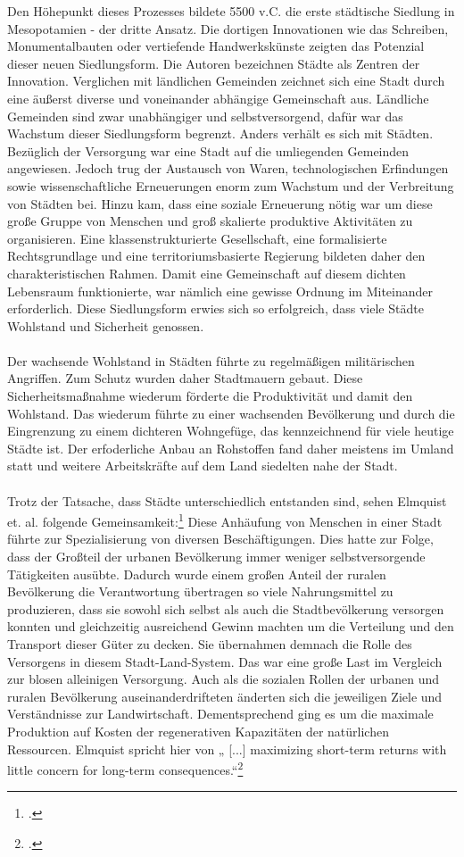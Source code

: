 \documentclass{scrartcl}
\begin{document}
Den Höhepunkt dieses Prozesses bildete 5500 v.C. die erste städtische Siedlung in Mesopotamien - der dritte Ansatz. Die dortigen Innovationen wie das Schreiben, Monumentalbauten oder vertiefende Handwerkskünste zeigten das Potenzial dieser neuen Siedlungsform. Die Autoren bezeichnen Städte als Zentren der Innovation. Verglichen mit ländlichen Gemeinden zeichnet sich eine Stadt durch eine äußerst diverse und voneinander abhängige Gemeinschaft aus. Ländliche Gemeinden sind zwar unabhängiger und selbstversorgend, dafür war das Wachstum dieser Siedlungsform begrenzt. Anders verhält es sich mit Städten. Bezüglich der Versorgung war eine Stadt auf die umliegenden Gemeinden angewiesen. Jedoch trug der Austausch von Waren, technologischen Erfindungen sowie wissenschaftliche Erneuerungen enorm zum Wachstum und der Verbreitung von Städten bei. Hinzu kam, dass eine soziale Erneuerung nötig war um diese große Gruppe von Menschen und groß skalierte produktive Aktivitäten zu organisieren. Eine klassenstrukturierte Gesellschaft, eine formalisierte Rechtsgrundlage und eine territoriumsbasierte Regierung bildeten daher den charakteristischen Rahmen. Damit eine Gemeinschaft auf diesem dichten Lebensraum funktionierte, war nämlich eine gewisse Ordnung im Miteinander erforderlich. Diese Siedlungsform erwies sich so erfolgreich, dass viele Städte Wohlstand und Sicherheit genossen. 
\\
\\
Der wachsende Wohlstand in Städten führte zu regelmäßigen militärischen Angriffen. Zum Schutz wurden daher Stadtmauern gebaut. Diese Sicherheitsmaßnahme wiederum förderte die Produktivität und damit den Wohlstand. Das wiederum führte zu einer wachsenden Bevölkerung und durch die Eingrenzung zu einem dichteren Wohngefüge, das kennzeichnend für viele heutige Städte ist. Der erfoderliche Anbau an Rohstoffen fand daher meistens im Umland statt und weitere Arbeitskräfte auf dem Land siedelten nahe der Stadt. \\
\\
Trotz der Tatsache, dass Städte unterschiedlich entstanden sind, sehen Elmquist et. al. folgende Gemeinsamkeit:\footcite[Vgl.][S.19ff]{Elmqvist2013} Diese Anhäufung von Menschen in einer Stadt führte zur Spezialisierung von diversen Beschäftigungen. Dies hatte zur Folge, dass der Großteil der urbanen Bevölkerung immer weniger selbstversorgende Tätigkeiten ausübte. Dadurch wurde einem großen Anteil der ruralen Bevölkerung die Verantwortung übertragen so viele Nahrungsmittel zu produzieren, dass sie sowohl sich selbst als auch die Stadtbevölkerung versorgen konnten und gleichzeitig ausreichend Gewinn machten um die Verteilung und den Transport dieser Güter zu decken. Sie übernahmen demnach die Rolle des Versorgens in diesem Stadt-Land-System. Das war eine große Last im Vergleich zur blosen alleinigen Versorgung. Auch als die sozialen Rollen der urbanen und ruralen Bevölkerung auseinanderdrifteten änderten sich die jeweiligen Ziele und Verständnisse zur Landwirtschaft. Dementsprechend ging es um die maximale Produktion auf Kosten der regenerativen Kapazitäten der natürlichen Ressourcen. Elmquist spricht hier von  „ [...] maximizing short-term returns with little concern for long-term consequences.“\footcite[S.20]{Elmqvist2013}
\end{document}
